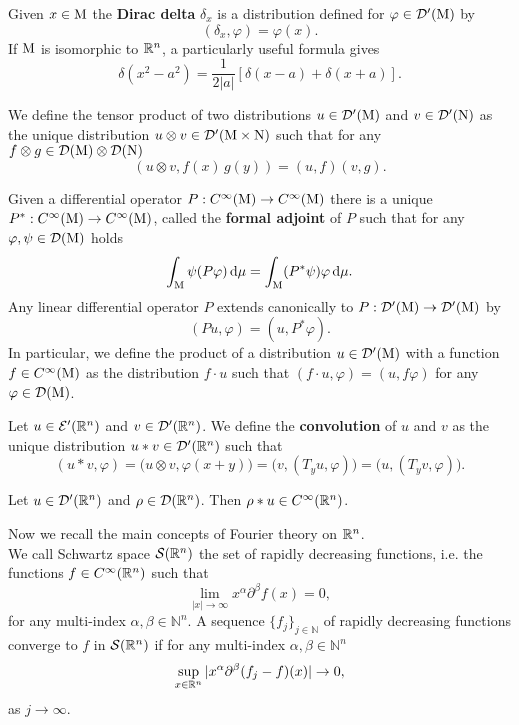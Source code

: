 \begin{example}
	Given $x\in\mathrm{M}$ the \textbf{Dirac delta} $\delta_x$ is a distribution defined for $\varphi\in\mathcal{D}'(\mathrm{M})$ by
	\[	(\delta_x,\varphi)=\varphi(x).		\]
	If $\mathrm{M}$ is isomorphic to ${\mathbb R}^n$, a particularly useful formula gives
	\begin{equation}
	\delta(x^2-a^2)=\frac{1}{2|a|}[\delta(x-a)+\delta(x+a)].
	\label{eq:delta1}
	\end{equation}
\end{example}


\begin{definition}
	We define the tensor product of two distributions $u\in\mathcal{D}'(\mathrm{M})$ and $v\in\mathcal{D}'(\mathrm{N})$ as the unique distribution $u\otimes v\in\mathcal{D}'(\mathrm{M}\times\mathrm{N})$ such that for any $f\otimes g\in\mathcal{D}(\mathrm{M})\otimes\mathcal{D}(\mathrm{N})$
	\[	(u\otimes v,f(x)\,g(y))=(u,f)(v,g).		\] 
\end{definition}
\noindent Given a differential operator $P:C^\infty(\mathrm{M})\to C^\infty(\mathrm{M})$ there is a unique $P^*:C^\infty(\mathrm{M})\to C^\infty(\mathrm{M})$, called the \textbf{formal adjoint} of $P$ such that for any $\varphi,\psi\in\mathcal{D}(\mathrm{M})$ holds
\[	\int_{\mathrm{M}}	\psi(P\varphi)\,\mathrm d\mu=\int_{\mathrm{M}}(P^*\psi)\varphi\,\mathrm d\mu.	\]
Any linear differential operator $P$ extends canonically to $P:\mathcal{D}'(\mathrm{M})\to\mathcal{D}'(\mathrm{M})$ by
\[	(Pu,\varphi)=(u,P^*\varphi).		\]
In particular, we define the product of a distribution $u\in\mathcal{D}'(\mathrm{M})$ with a function $f\in C^\infty(\mathrm{M})$ as the distribution $f\cdot u$ such that $(f\cdot u,\varphi)=(u,f\varphi)$ for any $\varphi\in\mathcal{D}(\mathrm{M})$.
\begin{definition}
	Let $u\in\mathcal{E}'({\mathbb R}^n)$ and $v\in\mathcal{D}'({\mathbb R}^n)$. We define the \textbf{convolution} of $u$ and $v$ as the unique distribution $u*v\in\mathcal{D}'({\mathbb R}^n)$ such that
	\[	(u*v,\varphi)=\big(u\otimes v,\varphi(x+y)\big)=\big(v,(T_yu,\varphi)\big)=\big(u,(T_yv,\varphi)\big).		\]
	
\end{definition}

\begin{theorem}
	Let $u\in\mathcal{D}'({\mathbb R}^n)$ and $\rho\in\mathcal{D}({\mathbb R}^n)$. Then $\rho*u\in C^\infty({\mathbb R}^n)$.
	\label{th:convolutionregularity}
\end{theorem}

Now we recall the main concepts of Fourier theory on ${\mathbb R}^n$.\\

\noindent We call Schwartz space $\mathcal{S}({\mathbb R}^n)$ the set of rapidly decreasing functions, i.e. the functions $f\in C^\infty({\mathbb R}^n)$ such that 
\[	\lim_{|x|\to\infty}x^\alpha\partial^\beta f(x)=0,		\]
for any multi-index $\alpha,\beta\in\mathbb{N}^n$. A sequence $\{f_j\}_{j\in\mathbb{N}}$ of rapidly decreasing functions converge to $f$ in $\mathcal{S}({\mathbb R}^n)$ if for any multi-index $\alpha,\beta\in\mathbb{N}^n$
\[	\sup_{x\in{\mathbb R}^n}|x^\alpha\partial^\beta (f_j-f)(x)|\to 0,	\]
as $j\to\infty$.

